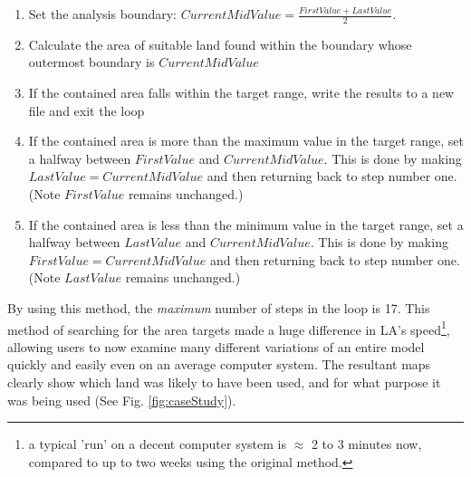   \begin{enumerate} 
  
  \item Set the analysis boundary: $CurrentMidValue=\frac{FirstValue +
  LastValue}{2}$.  
  
  \item Calculate the area of suitable land found within the boundary whose
  outermost boundary is $CurrentMidValue$ 
  
  \item If the contained area falls within the target range, write the results
  to a new file and exit the loop 
  
  \item If the contained area is more than the maximum value in the target
  range, set a halfway between $FirstValue$ and $CurrentMidValue$. This is done
  by making $LastValue=CurrentMidValue$ and then returning back to step number
  one.  (Note $FirstValue$ remains unchanged.) 
  
  \item If the contained area is less than the minimum value in the target
  range, set a halfway between $LastValue$ and $CurrentMidValue$. This is done
  by making $FirstValue=CurrentMidValue$ and then returning back to step number
  one.  (Note $LastValue$ remains unchanged.) 
  
  \end{enumerate}

By using this method, the \textit{maximum} number of steps in the loop is 17.
This method of searching for the area targets made a huge difference in LA's
speed\footnote{ a typical 'run' on a decent computer system is $\approx$ 2 to 3
minutes now, compared to up to two weeks using the original method.}, allowing
users to now examine many different variations of an entire model quickly and
easily even on an average computer system.  The resultant maps clearly show
which land was likely to have been used, and for what purpose it was being used (See Fig. \ref{fig:caseStudy}).
 
